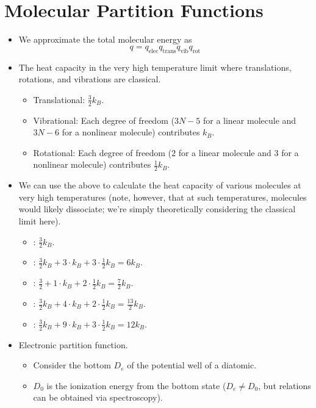 \documentclass[../notes.tex]{subfiles}
\begin{document}
\section{Molecular Partition Functions}
\begin{itemize}
    \item {}We approximate the total molecular energy as
    \begin{equation*}
        q = q_\text{elec}q_\text{trans}q_\text{vib}q_\text{rot}
    \end{equation*}
    \item The heat capacity in the very high temperature limit where translations, rotations, and vibrations are classical.
    \begin{itemize}
        \item Translational: $\frac{3}{2}k_B$.
        \item Vibrational: Each degree of freedom ($3N-5$ for a linear molecule and $3N-6$ for a nonlinear molecule) contributes $k_B$.
        \item Rotational: Each degree of freedom ($2$ for a linear molecule and $3$ for a nonlinear molecule) contributes $\frac{1}{2}k_B$.
    \end{itemize}
    \item We can use the above to calculate the heat capacity of various molecules at very high temperatures (note, however, that at such temperatures, molecules would likely dissociate; we're simply theoretically considering the classical limit here).
    \begin{itemize}
        \item {}: $\frac{3}{2}k_B$.
        \item {}: $\frac{3}{2}k_B+3\cdot k_B+3\cdot\frac{1}{2}k_B=6k_B$.
        \item {}: $\frac{3}{2}+1\cdot k_B+2\cdot\frac{1}{2}k_B=\frac{7}{2}k_B$.
        \item {}: $\frac{3}{2}k_B+4\cdot k_B+2\cdot\frac{1}{2}k_B=\frac{13}{2}k_B$.
        \item {}: $\frac{3}{2}k_B+9\cdot k_B+3\cdot\frac{1}{2}k_B=12 k_B$.
    \end{itemize}
    \item Electronic partition function.
    \begin{itemize}
        \item Consider the bottom $D_e$ of the potential well of a diatomic.
        \item $D_0$ is the ionization energy from the bottom state ($D_e\neq D_0$, but relations can be obtained via spectroscopy).

\end{itemize}
\end{itemize}
\end{document}
